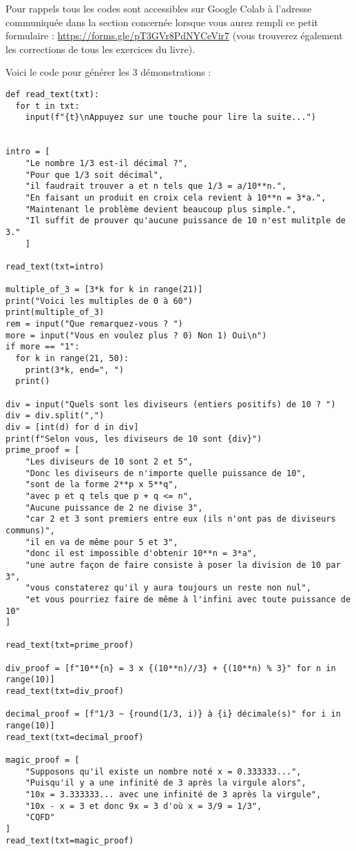 \documentclass[a4paper, 11pt, twoside]{article}
\begin{document}
Pour rappels tous les codes sont accessibles sur Google Colab à
l'adresse communiquée dans la section concernée lorsque vous
aurez rempli ce petit formulaire :
\url{https://forms.gle/pT3GVr8PdNYCeVir7} (vous trouverez également
les corrections de tous les exercices du livre).

Voici le code pour générer les 3 démonstrations :
\begin{verbatim}
def read_text(txt):
  for t in txt:
    input(f"{t}\nAppuyez sur une touche pour lire la suite...")


intro = [
    "Le nombre 1/3 est-il décimal ?",
    "Pour que 1/3 soit décimal",
    "il faudrait trouver a et n tels que 1/3 = a/10**n.",
    "En faisant un produit en croix cela revient à 10**n = 3*a.",
    "Maintenant le problème devient beaucoup plus simple.",
    "Il suffit de prouver qu'aucune puissance de 10 n'est mulitple de 3."
    ]

read_text(txt=intro)

multiple_of_3 = [3*k for k in range(21)]
print("Voici les multiples de 0 à 60")
print(multiple_of_3)
rem = input("Que remarquez-vous ? ")
more = input("Vous en voulez plus ? 0) Non 1) Oui\n")
if more == "1":
  for k in range(21, 50):
    print(3*k, end=", ")
  print()

div = input("Quels sont les diviseurs (entiers positifs) de 10 ? ")
div = div.split(",")
div = [int(d) for d in div]
print(f"Selon vous, les diviseurs de 10 sont {div}")
prime_proof = [
    "Les diviseurs de 10 sont 2 et 5",
    "Donc les diviseurs de n'importe quelle puissance de 10",
    "sont de la forme 2**p x 5**q",
    "avec p et q tels que p + q <= n",
    "Aucune puissance de 2 ne divise 3",
    "car 2 et 3 sont premiers entre eux (ils n'ont pas de diviseurs communs)",
    "il en va de même pour 5 et 3",
    "donc il est impossible d'obtenir 10**n = 3*a",
    "une autre façon de faire consiste à poser la division de 10 par 3",
    "vous constaterez qu'il y aura toujours un reste non nul",
    "et vous pourriez faire de même à l'infini avec toute puissance de 10"
]

read_text(txt=prime_proof)

div_proof = [f"10**{n} = 3 x {(10**n)//3} + {(10**n) % 3}" for n in range(10)]
read_text(txt=div_proof)

decimal_proof = [f"1/3 ~ {round(1/3, i)} à {i} décimale(s)" for i in range(10)]
read_text(txt=decimal_proof)

magic_proof = [
    "Supposons qu'il existe un nombre noté x = 0.333333...",
    "Puisqu'il y a une infinité de 3 après la virgule alors",
    "10x = 3.333333... avec une infinité de 3 après la virgule",
    "10x - x = 3 et donc 9x = 3 d'où x = 3/9 = 1/3",
    "CQFD"
]
read_text(txt=magic_proof)
\end{verbatim}
\stopcontents[level-2]
\stopcontents[level-1]
\end{document}
